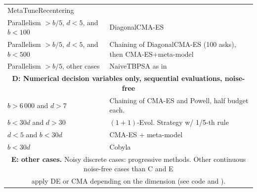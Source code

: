 \begin{algorithm*}[t]
\begin{tabular}{p{}|p{}}
		 {MetaTuneRecentering~\cite{ppsnrescaling}}
		  \\
		 {Parallelism $>b/5$, $d<5$, and $b<100$ }&
		 {DiagonalCMA-ES~\cite{diagcma}}
		  \\
		 {Parallelism $>b/5$, $d<5$, and $b<500$}&
		 {Chaining of DiagonalCMA-ES (100 asks), then 
		 CMA-ES+meta-model~\cite{astnew}}
		  \\
		 {Parallelism $>b/5$, other cases} &
		 {NaiveTBPSA as in~\cite{naiveTBPSA}}
		  \\
		  		 		  \hline
		  \multicolumn{2}{c}{{\textbf{D: Numerical decision variables only, sequential evaluations, {noise-free}}}}\\%
		  \hline 
		 {%
		  $b>6\,000$ and  $d>7$}&
		 {Chaining of CMA-ES and Powell, half budget each}.
		  \\
		 {$b<30d$ and $d>30$}&
		 {$(1+1)$-Evol. Strategy w/ 1/5-th rule~\cite{rechenberg}}
		  \\
		 {$d<5$ and $b<30d$}&
		 {CMA-ES + meta-model~\cite{astnew} }
		  \\
		 {$b<30d$ }&
		 {Cobyla~\cite{cobyla}}
		  \\
		  		 		  \hline
		  \multicolumn{2}{c}{\textbf{E: other cases.} Noisy discrete cases: progressive methods. Other continuous noise-free cases than C and E}\\
		  \multicolumn{2}{c}{apply DE or CMA depending on the dimension (see code and \cite{versatile}).}\\
		  \hline 
 		 \end{tabular}
	 \caption{\label{ngoptalg} High-level overview of \ngoptq{}. Selection rules are followed in this order, first match applied. $d=$ dimension, budget $b=$ number of evaluations. Details of ABBO and {the configuration of its base solvers} are available in the Nevergrad platform~\cite{nevergrad}, where ABBO is listed as NGOpt8. %
	 }
 \end{algorithm*}


